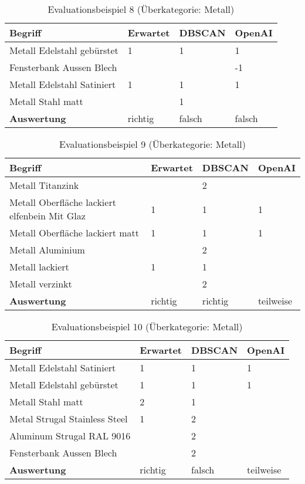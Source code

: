 \begin{table}[h]
	
	\centering
	\begin{tabular}{|l|l|l|l|}
		\hline
		\textbf{Begriff} & \textbf{Erwartet} & \textbf{DBSCAN} & \textbf{OpenAI}\\ \hline
		        Metall Edelstahl gebürstet & 1 & 1 & 1 \\ \hline
		Fensterbank Aussen Blech & ~ & ~ & -1 \\ \hline
		Metall Edelstahl Satiniert & 1 & 1 & 1 \\ \hline
		Metall Stahl matt & ~ & 1 & ~ \\ \hline
		\textbf{Auswertung} & richtig & falsch & falsch \\ \hline
	\end{tabular}
	\caption{Evaluationsbeispiel 8 (Überkategorie: Metall)}
	\label{t:evaluation-example8}
\end{table}

\begin{table}[h]
	
	\centering
	\begin{tabular}{|l|l|l|l|}
		\hline
		\textbf{Begriff} & \textbf{Erwartet} & \textbf{DBSCAN} & \textbf{OpenAI}\\ \hline
		   Metall Titanzink & ~ & 2 & ~ \\ \hline
		Metall Oberfläche lackiert elfenbein Mit Glaz & 1 & 1 & 1 \\ \hline
		Metall Oberfläche lackiert matt & 1 & 1 & 1 \\ \hline
		Metall Aluminium & ~ & 2 & ~ \\ \hline
		Metall lackiert & 1 & 1 & ~ \\ \hline
		Metall verzinkt & ~ & 2 & ~ \\ \hline
		\textbf{Auswertung} & richtig & richtig & teilweise \\ \hline
	\end{tabular}
	\caption{Evaluationsbeispiel 9 (Überkategorie: Metall)}
	\label{t:evaluation-example9}
\end{table}

\begin{table}[h]
	
	\centering
	\begin{tabular}{|l|l|l|l|}
		\hline
		\textbf{Begriff} & \textbf{Erwartet} & \textbf{DBSCAN} & \textbf{OpenAI}\\ \hline
		  Metall Edelstahl Satiniert & 1 & 1 & 1 \\ \hline
		Metall Edelstahl gebürstet & 1 & 1 & 1 \\ \hline
		Metall Stahl matt & 2 & 1 & ~ \\ \hline
		Metal Strugal Stainless Steel & 1 & 2 & ~ \\ \hline
		Aluminum Strugal RAL 9016 & ~ & 2 & ~ \\ \hline
		Fensterbank Aussen Blech & ~ & 2 & ~ \\ \hline
		\textbf{Auswertung} & richtig & falsch & teilweise \\ \hline
	\end{tabular}
	\caption{Evaluationsbeispiel 10 (Überkategorie: Metall)}
	\label{t:evaluation-example10}
\end{table}

